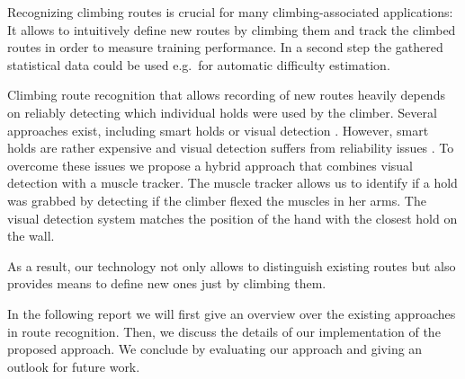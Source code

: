 Recognizing climbing routes is crucial for many climbing-associated applications:
It allows to intuitively define new routes by climbing them and track the climbed routes in order to measure training performance.
In a second step the gathered statistical data could be used e.g.\ for automatic difficulty estimation.

Climbing route recognition that allows recording of new routes heavily depends on reliably detecting which individual holds were used by the climber.
Several approaches exist, including smart holds \cite{Kistler:Online, Lechner:Online} or visual detection \cite{pub8245, Wiehr:2016:BET:2851581.2892393, Kajastila:2014:ACI:2611780.2581139, Kajastila:2014:ACI:2559206.2581139}.
However, smart holds are rather expensive and visual detection suffers from reliability issues \cite{pub8245, Wiehr:2016:BET:2851581.2892393, Kajastila:2014:ACI:2611780.2581139, Kajastila:2014:ACI:2559206.2581139}.
To overcome these issues we propose a hybrid approach that combines visual detection with a muscle tracker.
The muscle tracker allows us to identify if a hold was grabbed by detecting if the climber flexed the muscles in her arms.
The visual detection system matches the position of the hand with the closest hold on the wall.

As a result, our technology not only allows to distinguish existing routes but also provides means to define new ones just by climbing them.

In the following report we will first give an overview over the existing approaches in route recognition.
Then, we discuss the details of our implementation of the proposed approach.
We conclude by evaluating our approach and giving an outlook for future work.
